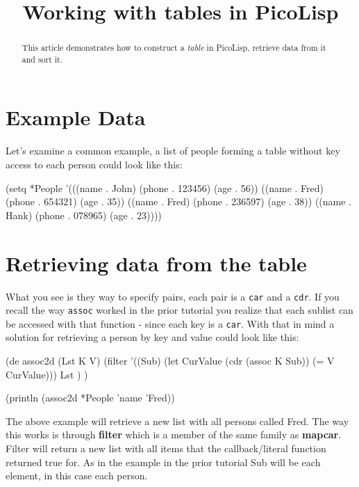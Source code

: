 \title{Working with tables in PicoLisp}

\maketitle

\begin{abstract}
  This article demonstrates how to construct a \emph{table} in
  PicoLisp, retrieve data from it and sort it. 
\end{abstract}

\section{Example Data}
\label{sec:work-with-tables-example-data}

Let's examine a common example, a list of people forming a table without
key access to each person could look like this:

\begin{wideverbatim}
(setq *People 
      '(((name . John) (phone . 123456) (age . 56))
        ((name . Fred) (phone . 654321) (age . 35))
        ((name . Fred) (phone . 236597) (age . 38))
        ((name . Hank) (phone . 078965) (age . 23))))
\end{wideverbatim}


\section{Retrieving data from the table}
\label{sec:work-with-tables-retrieving-data-from-the-table}


What you see is they way to specify pairs, each pair is a \texttt{car}
and a \texttt{cdr}. If you recall the way \texttt{assoc} worked in the
prior tutorial you realize that each sublist can be accessed with that
function - since each key is a \texttt{car}. With that in mind a solution for
retrieving a person by key and value could look like this:


\begin{wideverbatim}
(de assoc2d (Lst K V)
    (filter '((Sub)
              (let CurValue (cdr (assoc K Sub))
                (= V CurValue))) Lst ) )
                
(println (assoc2d *People 'name 'Fred))
\end{wideverbatim}

The above example will retrieve a new list with all persons called Fred.
The way this works is through \textbf{filter} which is a member of the same
family as \textbf{mapcar}. Filter will return a new list with all items that
the callback/literal function returned true for. As in the example in
the prior tutorial Sub will be each element, in this case each person.

